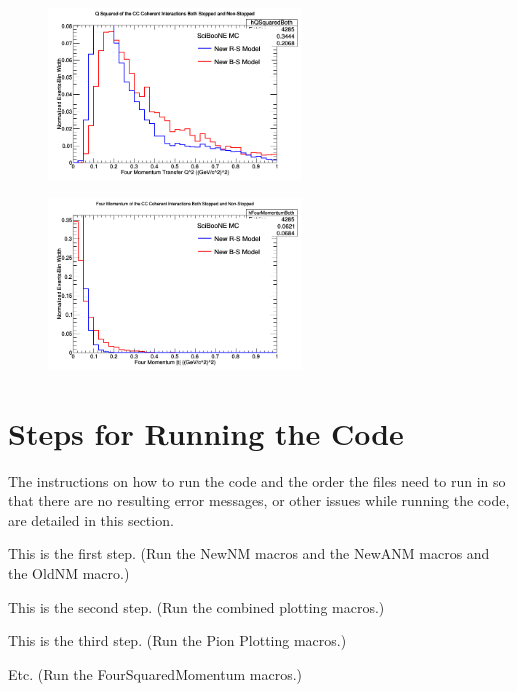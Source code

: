 \documentclass[11pt]{article}
\begin{document}
\begin{figure}[H]
\centering
\includegraphics[width=0.6\textwidth]{ANMFourSquaredPlottingImages/5-ANMFourSquaredPlotting.png}
\caption{}
\end{figure}

\begin{figure}[H]
\centering
\includegraphics[width=0.6\textwidth]{ANMFourSquaredPlottingImages/6-ANMFourSquaredPlotting.png}
\caption{}
\end{figure}



\section{Steps for Running the Code}
The instructions on how to run the code and the order the files need to run in so that there are no resulting error messages, or other issues while running the code, are detailed in this section.

\begin{adjustwidth}{4.0em}{0pt}
\begin{steps}
  \item This is the first step. (Run the NewNM macros and the NewANM macros and the OldNM macro.)
  \item This is the second step. (Run the combined plotting macros.)
  \item This is the third step. (Run the Pion Plotting macros.)
  \item Etc. (Run the FourSquaredMomentum macros.)
\end{steps}
\end{adjustwidth}
\end{document}
